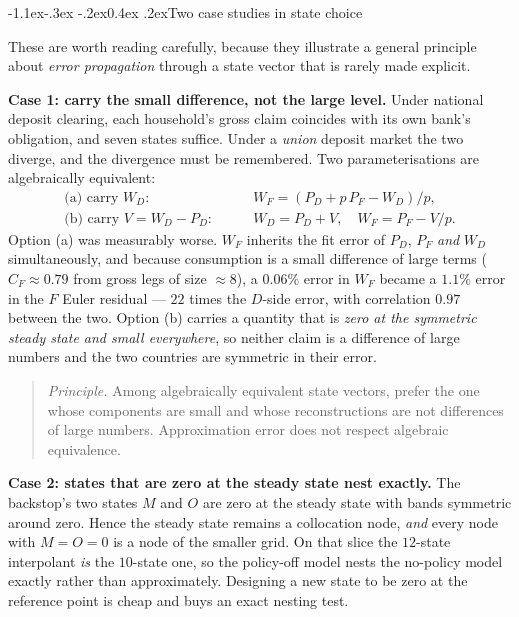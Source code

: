 \documentclass[10pt,a4paper]{article}
\makeatletter
\theoremstyle{definition}
\theoremstyle{plain}
\theoremstyle{remark}
\renewcommand\subsection{\@startsection{subsection}{2}{\z@}%
  {-1.1ex\@plus -.3ex \@minus -.2ex}{0.4ex \@plus .2ex}{\normalfont\normalsize\bfseries}}
\makeatother
\begin{document}
\subsection{Two case studies in state choice}
\label{sec:statecase}

These are worth reading carefully, because they illustrate a general principle about
\emph{error propagation} through a state vector that is rarely made explicit.

\textbf{Case 1: carry the small difference, not the large level.} Under national deposit
clearing, each household's gross claim coincides with its own bank's obligation, and seven
states suffice. Under a \emph{union} deposit market the two diverge, and the divergence must be
remembered. Two parameterisations are algebraically equivalent:
\begin{align}
  \text{(a) carry } W_D:&\qquad W_F = (P_D + p\,P_F - W_D)/p, \\
  \text{(b) carry } V = W_D - P_D:&\qquad W_D = P_D + V,\quad W_F = P_F - V/p .
\end{align}
Option (a) was measurably worse. $W_F$ inherits the fit error of $P_D$, $P_F$ \emph{and} $W_D$
simultaneously, and because consumption is a small difference of large terms
($C_F \approx 0.79$ from gross legs of size $\approx 8$), a $0.06\%$ error in $W_F$ became a
$1.1\%$ error in the $F$ Euler residual --- $22$ times the $D$-side error, with correlation
$0.97$ between the two. Option (b) carries a quantity that is \emph{zero at the symmetric
steady state and small everywhere}, so neither claim is a difference of large numbers and the
two countries are symmetric in their error.

\begin{quote}
\emph{Principle.} Among algebraically equivalent state vectors, prefer the one whose
components are small and whose reconstructions are not differences of large numbers.
Approximation error does not respect algebraic equivalence.
\end{quote}

\textbf{Case 2: states that are zero at the steady state nest exactly.} The backstop's two
states $M$ and $O$ are zero at the steady state with bands symmetric around zero. Hence the
steady state remains a collocation node, \emph{and} every node with $M=O=0$ is a node of the
smaller grid. On that slice the $12$-state interpolant \emph{is} the $10$-state one, so the
policy-off model nests the no-policy model exactly rather than approximately. Designing a new
state to be zero at the reference point is cheap and buys an exact nesting test.
\end{document}
